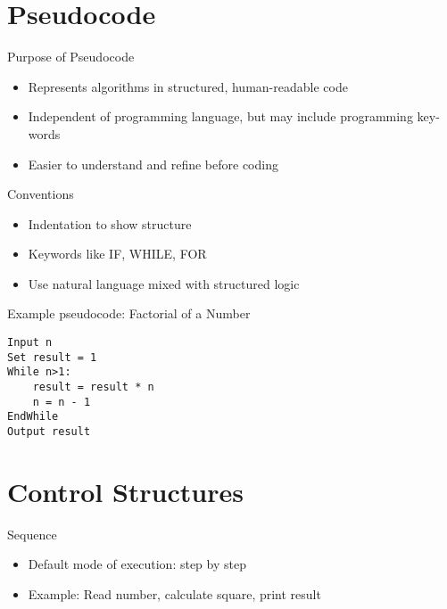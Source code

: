 \documentclass[12pt, aspectratio=169]{beamer}
\begin{document}
    \section{Pseudocode}


    \begin{frame}{Purpose of Pseudocode}
        \begin{itemize}
            \item Represents algorithms in structured, human-readable code
            \item Independent of programming language, but may include programming key-words
            \item Easier to understand and refine before coding
        \end{itemize}
    \end{frame}


    \begin{frame}{Conventions}
        \begin{itemize}
            \item Indentation to show structure
            \item Keywords like IF, WHILE, FOR
            \item Use natural language mixed with structured logic
        \end{itemize}
    \end{frame}


    \begin{frame}[fragile]{Example pseudocode: Factorial of a Number}
        \begin{verbatim}
Input n
Set result = 1
While n>1:
    result = result * n
    n = n - 1
EndWhile
Output result
        \end{verbatim}
    \end{frame}


    \section{Control Structures}

    \begin{frame}{Sequence}
        \begin{itemize}
            \item Default mode of execution: step by step
            \item Example: Read number, calculate square, print result
        \end{itemize}
    \end{frame}
\end{document}
